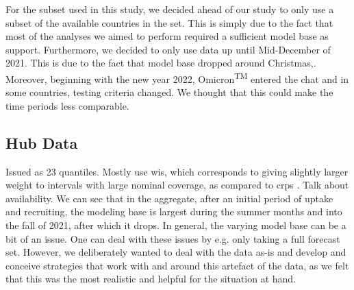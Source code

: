 For the subset used in this study, we decided ahead of our study to only use a subset of the available countries in the set. This is simply due to the fact that most of the analyses we aimed to perform required a sufficient model base as support. Furthermore, we decided to only use data up until Mid-December of 2021. This is due to the fact that model base dropped around Christmas,. Moreover, beginning with the new year 2022, Omicron\textsuperscript{TM} entered the chat and in some countries, testing criteria changed. We thought that this could make the time periods less comparable.\\
\subsection{Hub Data}
Issued as 23 quantiles. Mostly use \ac{wis}, which corresponds to giving slightly larger weight to intervals with large nominal coverage, as compared to \ac{crps} \citep{bracher_evaluating_2021}.
Talk about availability. We can see that in the aggregate, after an initial period of uptake and recruiting, the modeling base is largest during the summer months and into the fall of 2021, after which it drops.
In general, the varying model base can be a bit of an issue. One can deal with these issues by e.g. only taking a full forecast set. However, we deliberately wanted to deal with the data as-is and develop and conceive strategies that work with and around this artefact of the data, as we felt that this was the most realistic and helpful for the situation at hand. 
